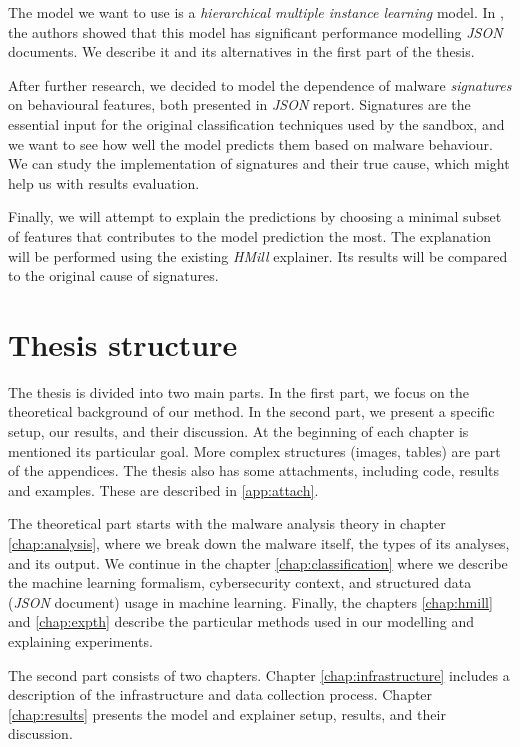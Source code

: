 The model we want to use is a \emph{hierarchical multiple instance learning} model. In \cite{Mandlik2020}, the authors showed that this model has significant performance modelling \emph{JSON} documents. We describe it and its alternatives in the first part of the thesis. 

After further research, we decided to model the dependence of malware \emph{signatures} on behavioural features, both presented in \emph{JSON} report. Signatures are the essential input for the original classification techniques used by the sandbox, and we want to see how well the model predicts them based on malware behaviour. We can study the implementation of signatures and their true cause, which might help us with results evaluation.

Finally, we will attempt to explain the predictions by choosing a minimal subset of features that contributes to the model prediction the most. The explanation will be performed using the existing \emph{HMill} explainer. Its results will be compared to the original cause of signatures.

\section*{Thesis structure}
The thesis is divided into two main parts. In the first part, we focus on the theoretical background of our method. In the second part, we present a specific setup, our results, and their discussion. At the beginning of each chapter is mentioned its particular goal. More complex structures (images, tables) are part of the appendices. The thesis also has some attachments, including code, results and examples. These are described in \ref{app:attach}.

The theoretical part starts with the malware analysis theory in chapter \ref{chap:analysis}, where we break down the malware itself, the types of its analyses, and its output. We continue in the chapter \ref{chap:classification} where we describe the machine learning formalism, cybersecurity context, and structured data (\emph{JSON} document) usage in machine learning. Finally, the chapters \ref{chap:hmill} and \ref{chap:expth} describe the particular methods used in our modelling and explaining experiments.

The second part consists of two chapters. Chapter \ref{chap:infrastructure} includes a description of the infrastructure and data collection process. Chapter \ref{chap:results} presents the model and explainer setup, results, and their discussion.




